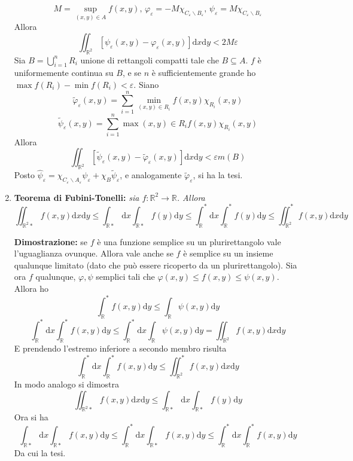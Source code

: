 \documentclass[a4paper,11pt]{article}
\begin{document}
\begin{enumerate}
	\[M=\sup_{(x,y)\in A}f(x,y)\textrm{,  }\varphi_\varepsilon=-M\chi_{C_\varepsilon\backslash B_\varepsilon}\textrm{,  }\psi_\varepsilon=M\chi_{C_\varepsilon\backslash B_\varepsilon}\]
	Allora \[\iint_{\mathbb{R}^2}\left[\psi_\varepsilon(x,y)-\varphi_\varepsilon(x,y)\right]\mathrm{d}x\mathrm{d}y<2M\varepsilon\]
	Sia $B=\bigcup_{i=1}^{n}R_i$ unione di rettangoli compatti tale che $B\subseteq A$. $f$ è uniformemente continua su $B$, e se $n$ è sufficientemente grande ho $\max f(R_i)-\min f(R_i)<\varepsilon$. Siano \[\tilde{\varphi}_\varepsilon(x,y)=\sum_{i=1}^{n}\min_{(x,y)\in R_i}f(x,y)\chi_{R_i}(x,y)\]
	\[\tilde{\psi}_\varepsilon(x,y)=\sum_{i=1}^{n}\max{(x,y)\in R_i}f(x,y)\chi_{R_i}(x,y)\]
	Allora
	\[\iint_{\mathbb{R}^2}\left[\tilde{\psi}_\varepsilon(x,y)-\tilde{\varphi}_\varepsilon(x,y)\right]\mathrm{d}x\mathrm{d}y<\varepsilon m(B)\]
	Posto $\hat{\psi}_\varepsilon=\chi_{C_\varepsilon\backslash A_\varepsilon}\psi_\varepsilon+\chi_B\tilde{\psi}_\varepsilon$, e analogamente $\tilde{\varphi}_\varepsilon$, si ha la tesi.
	\item \textbf{Teorema di Fubini-Tonelli:} \textit{sia $f\colon\mathbb{R}^2\to\mathbb{R}$. Allora
	\[\iint_{\mathbb{R}^2*}f(x,y)\mathrm{d}x\mathrm{d}y\leq\int_{\mathbb{R}*}\mathrm{d}x\int_{\mathbb{R}*}f(y)\mathrm{d}y\leq\int_{\mathbb{R}}^{*}\mathrm{d}x\int_{\mathbb{R}}^{*}f(y)\mathrm{d}y\leq\iint_{\mathbb{R}^2}^{*}f(x,y)\mathrm{d}x\mathrm{d}y\]}

	\textbf{Dimostrazione:} se $f$ è una funzione semplice su un plurirettangolo vale l'uguaglianza ovunque. Allora vale anche se $f$ è semplice su un insieme qualunque limitato (dato che può essere ricoperto da un plurirettangolo). Sia ora $f$ qualunque, $\varphi,\psi$ semplici tali che $\varphi(x,y)\leq f(x,y)\leq\psi(x,y)$. Allora ho
	\[\int_{\mathbb{R}}^{*}f(x,y)\mathrm{d}y\leq\int_{\mathbb{R}}\psi(x,y)\mathrm{d}y\]
	\[\int_{\mathbb{R}}^{*}\mathrm{d}x\int_{\mathbb{R}}^{*}f(x,y)\mathrm{d}y\leq\int_{\mathbb{R}}^{*}\mathrm{d}x\int_{\mathbb{R}}\psi(x,y)\mathrm{d}y=\iint_{\mathbb{R}^2}f(x,y)\mathrm{d}x\mathrm{d}y\]
	E prendendo l'estremo inferiore a secondo membro risulta
	\[\int_{\mathbb{R}}^{*}\mathrm{d}x\int_{\mathbb{R}}^{*}f(x,y)\mathrm{d}y\leq\iint_{\mathbb{R}^2}^{*}f(x,y)\mathrm{d}x\mathrm{d}y\]
	In modo analogo si dimostra
	\[\iint_{\mathbb{R}^2*}f(x,y)\mathrm{d}x\mathrm{d}y\leq\int_{\mathbb{R}*}\mathrm{d}x\int_{\mathbb{R}*}f(y)\mathrm{d}y\]
	Ora si ha
	\[\int_{\mathbb{R}*}\mathrm{d}x\int_{\mathbb{R}*}f(x,y)\mathrm{d}y\leq\int_{\mathbb{R}}^{*}\mathrm{d}x\int_{\mathbb{R}*}f(x,y)\mathrm{d}y\leq\int_{\mathbb{R}}^{*}\mathrm{d}x\int_{\mathbb{R}}^{*}f(x,y)\mathrm{d}y\]
	Da cui la tesi.
	

\end{enumerate}
\end{document}
